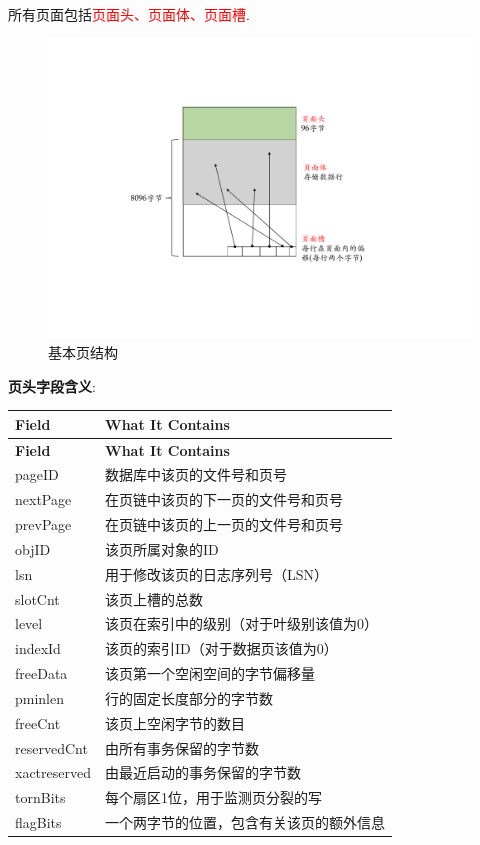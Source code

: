 所有页面包括\textcolor{red}{页面头、页面体、页面槽}.

\begin{figure}[H]
    \centering
    \includegraphics[width=.6\textwidth]{figure/基本页结构.pdf}
    \caption{基本页结构}
\end{figure}

\textbf{页头字段含义}:

\begin{longtable}{|p{3cm}|p{10cm}|}
\hline
\textbf{Field} & \textbf{What It Contains} \\
\hline
\endfirsthead

\hline
\textbf{Field} & \textbf{What It Contains} \\
\hline
\endhead

pageID & 数据库中该页的文件号和页号 \\
\hline
nextPage & 在页链中该页的下一页的文件号和页号 \\
\hline
prevPage & 在页链中该页的上一页的文件号和页号 \\
\hline
objID & 该页所属对象的ID \\
\hline
lsn & 用于修改该页的日志序列号（LSN） \\
\hline
slotCnt & 该页上槽的总数 \\
\hline
level & 该页在索引中的级别（对于叶级别该值为0） \\
\hline
indexId & 该页的索引ID（对于数据页该值为0） \\
\hline
freeData & 该页第一个空闲空间的字节偏移量 \\
\hline
pminlen & 行的固定长度部分的字节数 \\
\hline
freeCnt & 该页上空闲字节的数目 \\
\hline
reservedCnt & 由所有事务保留的字节数 \\
\hline
xactreserved & 由最近启动的事务保留的字节数 \\
\hline
tornBits & 每个扇区1位，用于监测页分裂的写 \\
\hline
flagBits & 一个两字节的位置，包含有关该页的额外信息 \\
\hline

\end{longtable}


